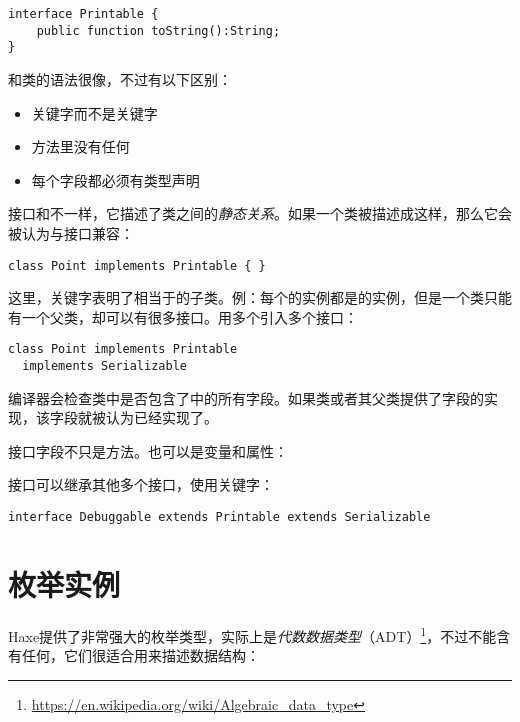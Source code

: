 \begin{lstlisting}
interface Printable {
	public function toString():String;
}
\end{lstlisting}
和类的语法很像，不过有以下区别：

\begin{itemize}
	\item {}关键字而不是关键字
	\item 方法里没有任何
	\item 每个字段都必须有类型声明
\end{itemize}
接口和不一样，它描述了类之间的\emph{静态关系}。如果一个类被描述成这样，那么它会被认为与接口兼容：


\begin{lstlisting}
class Point implements Printable { }
\end{lstlisting}
这里，关键字表明了相当于的子类。例：每个的实例都是的实例，但是一个类只能有一个父类，却可以有很多接口。用多个引入多个接口：

\begin{lstlisting}
class Point implements Printable
  implements Serializable
\end{lstlisting}

编译器会检查类中是否包含了中的所有字段。如果类或者其父类提供了字段的实现，该字段就被认为已经实现了。

接口字段不只是方法。也可以是变量和属性：


接口可以继承其他多个接口，使用关键字：
\begin{lstlisting}
interface Debuggable extends Printable extends Serializable
\end{lstlisting}


\section{枚举实例}
\label{types-enum-instance}

Haxe提供了非常强大的枚举类型，实际上是\emph{代数数据类型}（ADT）\footnote{\url{https://en.wikipedia.org/wiki/Algebraic_data_type}}，不过不能含有任何，它们很适合用来描述数据结构：

